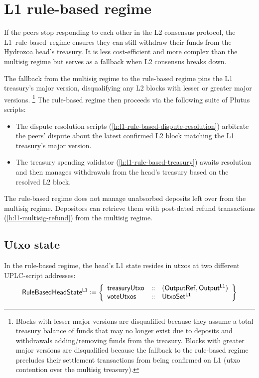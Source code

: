 \documentclass[../hydrozoa.tex]{subfiles}
\begin{document}
\chapter{L1 rule-based regime}%
\label{h:l1-rule-based-regime}%

If the peers stop responding to each other in the L2 consensus protocol, the L1~rule-based~regime ensures they can still withdraw their funds from the Hydrozoa head's treasury.
It is less cost-efficient and more complex than the multisig regime but serves as a fallback when L2 consensus breaks down.

The fallback from the multisig regime to the rule-based regime pins the L1 treasury's major version, disqualifying any L2 blocks with lesser or greater major versions.%
\footnote{Blocks with lesser major versions are disqualified because they assume a total treasury balance of funds that may no longer exist due to deposits and withdrawals adding/removing funds from the treasury.
  Blocks with greater major versions are disqualified because the fallback to the rule-based regime precludes their settlement transactions from being confirmed on L1 (utxo contention over the multisig treasury).}
The rule-based regime then proceeds via the following suite of Plutus scripts:
\begin{itemize}
  \item The dispute resolution scripts (\cref{h:l1-rule-based-dispute-resolution}) arbitrate the peers' dispute about the latest confirmed L2 block matching the L1 treasury's major version.
  \item The treasury spending validator (\cref{h:l1-rule-based-treasury}) awaits resolution and then manages withdrawals from the head's treasury based on the resolved L2 block.
\end{itemize}

The rule-based regime does not manage unabsorbed deposits left over from the multisig regime.
Depositors can retrieve them with post-dated refund transactions (\cref{h:l1-multisig-refund}) from the multisig regime.

\section{Utxo state}%
\label{h:l1-rule-based-utxo-state}%

In the rule-based regime, the head's L1 state resides in utxos at two different UPLC-script addresses:
\begin{equation*}
  \mathsf{RuleBasedHeadState^{L1}} \coloneq \left\{
  \begin{array}{lll}
    \mathsf{treasuryUtxo} &::& (\mathsf{OutputRef}, \mathsf{Output^{L1}}) \\
    \mathsf{voteUtxos} &::& \mathsf{UtxoSet^{L1}}
  \end{array}\right\}
\end{equation*}
\end{document}
